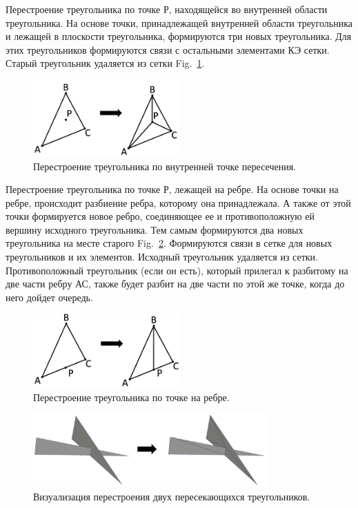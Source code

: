 \documentclass[
11pt,%
tightenlines,%
twoside,%
onecolumn,%
nofloats,%
nobibnotes,%
nofootinbib,%
superscriptaddress,%
noshowpacs,%
centertags]%
{revtex4}
\begin{document}
Перестроение треугольника по точке Р, находящейся во внутренней области треугольника. На основе точки, принадлежащей внутренней области треугольника и лежащей в плоскости треугольника, формируются три новых треугольника. Для этих треугольников формируются связи с остальными элементами КЭ сетки. Старый треугольник удаляется из сетки Fig.~\ref{fig:7}.

\begin{figure}[h]
\includegraphics[width=0.5\textwidth]{pics/pic_7.png}
\caption{Перестроение треугольника по внутренней точке пересечения.}\label{fig:7}
\end{figure}

Перестроение треугольника по точке Р, лежащей на ребре. На основе точки на ребре, происходит разбиение ребра, которому она принадлежала. А также от этой точки формируется новое ребро, соединяющее ее и противоположную ей вершину исходного треугольника. Тем самым формируются два новых треугольника на месте старого Fig.~\ref{fig:8}. Формируются связи в сетке для новых треугольников и их элементов. Исходный треугольник удаляется из сетки. Противоположный треугольник (если он есть), который прилегал к разбитому на две части ребру АС, также будет разбит на две части по этой же точке, когда до него дойдет очередь.

\begin{figure}[h]
\includegraphics[width=0.5\textwidth]{pics/pic_8.png}
\caption{Перестроение треугольника по точке на ребре.}\label{fig:8}
\end{figure}

\begin{figure}[h]
\includegraphics[width=0.8\textwidth]{pics/pic_9.png}
\caption{Визуализация перестроения двух пересекающихся треугольников.}\label{fig:9}
\end{figure}
\end{document}
